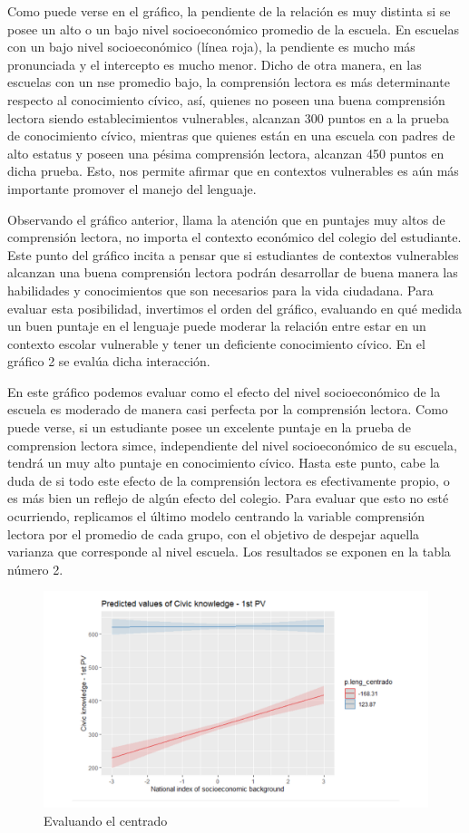 \documentclass[
]{article}
\begin{document}
Como puede verse en el gráfico, la pendiente de la relación es muy
distinta si se posee un alto o un bajo nivel socioeconómico promedio de
la escuela. En escuelas con un bajo nivel socioeconómico (línea roja),
la pendiente es mucho más pronunciada y el intercepto es mucho menor.
Dicho de otra manera, en las escuelas con un nse promedio bajo, la
comprensión lectora es más determinante respecto al conocimiento cívico,
así, quienes no poseen una buena comprensión lectora siendo
establecimientos vulnerables, alcanzan 300 puntos en a la prueba de
conocimiento cívico, mientras que quienes están en una escuela con
padres de alto estatus y poseen una pésima comprensión lectora, alcanzan
450 puntos en dicha prueba. Esto, nos permite afirmar que en contextos
vulnerables es aún más importante promover el manejo del lenguaje.

Observando el gráfico anterior, llama la atención que en puntajes muy
altos de comprensión lectora, no importa el contexto económico del
colegio del estudiante. Este punto del gráfico incita a pensar que si
estudiantes de contextos vulnerables alcanzan una buena comprensión
lectora podrán desarrollar de buena manera las habilidades y
conocimientos que son necesarios para la vida ciudadana. Para evaluar
esta posibilidad, invertimos el orden del gráfico, evaluando en qué
medida un buen puntaje en el lenguaje puede moderar la relación entre
estar en un contexto escolar vulnerable y tener un deficiente
conocimiento cívico. En el gráfico 2 se evalúa dicha interacción.

En este gráfico podemos evaluar como el efecto del nivel socioeconómico
de la escuela es moderado de manera casi perfecta por la comprensión
lectora. Como puede verse, si un estudiante posee un excelente puntaje
en la prueba de comprension lectora simce, independiente del nivel
socioeconómico de su escuela, tendrá un muy alto puntaje en conocimiento
cívico. Hasta este punto, cabe la duda de si todo este efecto de la
comprensión lectora es efectivamente propio, o es más bien un reflejo de
algún efecto del colegio. Para evaluar que esto no esté ocurriendo,
replicamos el último modelo centrando la variable comprensión lectora
por el promedio de cada grupo, con el objetivo de despejar aquella
varianza que corresponde al nivel escuela. Los resultados se exponen en
la tabla número 2.

\begin{figure}
\centering
\includegraphics{../output/images/G2.png}
\caption{Evaluando el centrado}
\end{figure}
\end{document}
